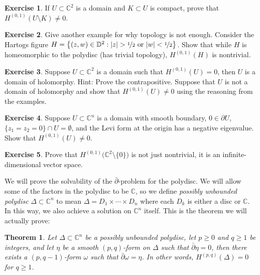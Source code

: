 \documentclass[12pt,openany]{book}
\newcommand{\sabs}[1]{\lvert {#1} \rvert}
\newcommand{\C}{{\mathbb{C}}}
\newcommand{\D}{{\mathbb{D}}}
\newcommand{\myindex}[1]{#1\index{#1}}
\theoremstyle{plain}
\newtheorem{thm}{Theorem}[section]
\theoremstyle{remark}
\theoremstyle{definition}
\newenvironment{exbox}{%
    \def\FrameCommand{\vrule width 1pt \relax\hspace{10pt}}%
    \MakeFramed{\advance\hsize-\width\FrameRestore}%
}{%
    \endMakeFramed
}
\theoremstyle{exercise}
\newtheorem{exercise}{Exercise}[section]
\theoremstyle{example}
\begin{document}
\begin{exbox}
\begin{exercise}
If $U \subset \C^2$ is a domain and $K \subset U$ is compact,
prove that $H^{(0,1)}(U \setminus K) \neq 0$.
\end{exercise}

\begin{exercise}
Give another example for why topology is not enough.  Consider the
Hartogs figure
$H =
\bigl\{ (z,w) \in \D^{2} : \sabs{z} > \nicefrac{1}{2} \text{ or }
\sabs{w} < \nicefrac{1}{2}
\bigr\}$.
Show that while $H$ is homeomorphic to the polydisc (has trivial topology),
$H^{(0,1)}(H)$ is nontrivial.
\end{exercise}

\begin{exercise}
Suppose $U \subset \C^2$ is a domain such that $H^{(0,1)}(U) = 0$,
then $U$ is a domain of holomorphy.
Hint: Prove the contrapositive.
Suppose that $U$ is not a domain of
holomorphy and show that $H^{(0,1)}(U) \neq 0$ using the reasoning from
the examples.
\end{exercise}

\begin{exercise} \label{exercise:Levinegdol}
Suppose $U \subset \C^n$ is a domain with smooth boundary,
$0 \in \partial U$, $\{ z_1=z_2 =0\} \cap U = \emptyset$, and the Levi form
at the origin has a negative eigenvalue.  Show that
$H^{(0,1)}(U) \neq 0$.
\end{exercise}

\begin{exercise}
Prove that $H^{(0,1)}\bigl(\C^2 \setminus \{ 0 \} \bigr)$ is not just
nontrivial, it is an infinite-dimensional vector space.
\end{exercise}
\end{exbox}

We will prove the solvability of the $\bar{\partial}$-problem for the
polydisc.
We will allow some of the factors in the polydisc to be $\C$,
so we define \emph{\myindex{possibly unbounded polydisc}}
$\Delta \subset \C^n$
to mean $\Delta = D_1 \times \cdots \times D_n$ where
each $D_k$ is either a disc or $\C$.  In this way, we also achieve a
solution on $\C^n$ itself.  This is the theorem we will actually prove:

\begin{thm} \label{thm:dbaronpoly}
Let $\Delta \subset \C^n$ be a possibly unbounded polydisc,
let $p \geq 0$ and $q \geq 1$ be integers, and
let $\eta$ be a smooth $(p,q)$-form on $\Delta$ such that
$\bar{\partial} \eta = 0$, then there exists a $(p,q-1)$-form $\omega$
such that $\bar{\partial} \omega = \eta$.
In other words, $H^{(p,q)}(\Delta) = 0$ for $q \geq 1$.
\end{thm}
\end{document}
